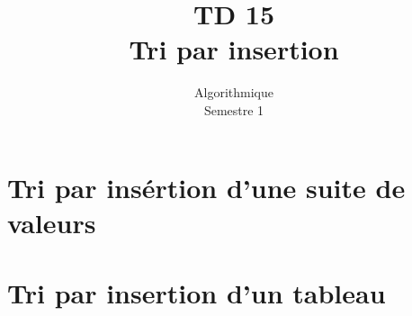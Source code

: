 \documentclass{article}
\title{TD 15\\ Tri par insertion}
\date{Algorithmique\\ Semestre 1}
\begin{document}
	\maketitle
	\section{Tri par insértion d'une suite de valeurs}
		\subsection{}
			
		\subsection{}
			
		\subsection{}
			
		\subsection{}
			
	\section{Tri par insertion d'un tableau}
		\subsection{}
			
		\subsection{}
			
\end{document}
